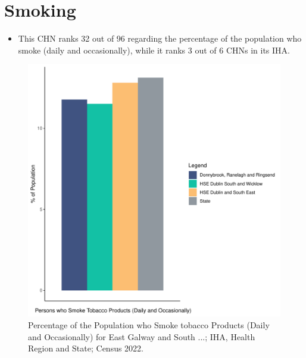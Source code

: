 \documentclass{article}
\begin{document}
\pagebreak

\section{Smoking}\label{sect:Smoking}
\begin{itemize}
\item This CHN ranks  32 out of 96 regarding the percentage of the population who smoke (daily and occasionally), while it ranks   3 out of 6 CHNs in its IHA.
\end{itemize}
\begin{figure}[H]
	\centering
	\includegraphics[width = 120mm]{../figures/SmokingED.pdf}
	\caption{Percentage of the Population who Smoke tobacco Products (Daily and Occasionally) for East Galway and South ...; IHA, Health Region and State; Census 2022.}
	\label{fig:2ae19629-1a6a-13a3-e055-000000000001}
	\end{figure}
	
\end{document}
